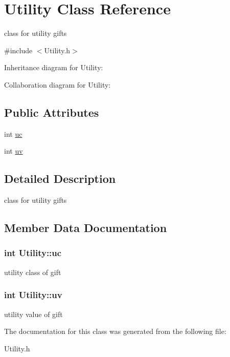 \hypertarget{classUtility}{}\section{Utility Class Reference}
\label{classUtility}


class for utility gifts  




{\ttfamily \#include $<$Utility.\+h$>$}



Inheritance diagram for Utility\+:


Collaboration diagram for Utility\+:
\subsection*{Public Attributes}
\begin{DoxyCompactItemize}
\item 
int \hyperlink{classUtility_ab04b1a933ee0cb62b34cc8cc21f6cf41}{uc}
\item 
int \hyperlink{classUtility_a70384995a315952127b7bba1c32b2a9f}{uv}
\end{DoxyCompactItemize}


\subsection{Detailed Description}
class for utility gifts 

\subsection{Member Data Documentation}
\subsubsection[{\texorpdfstring{uc}{uc}}]{\setlength{\rightskip}{0pt plus 5cm}int Utility\+::uc}\hypertarget{classUtility_ab04b1a933ee0cb62b34cc8cc21f6cf41}{}\label{classUtility_ab04b1a933ee0cb62b34cc8cc21f6cf41}
utility class of gift 
\subsubsection[{\texorpdfstring{uv}{uv}}]{\setlength{\rightskip}{0pt plus 5cm}int Utility\+::uv}\hypertarget{classUtility_a70384995a315952127b7bba1c32b2a9f}{}\label{classUtility_a70384995a315952127b7bba1c32b2a9f}
utility value of gift 

The documentation for this class was generated from the following file\+:\begin{DoxyCompactItemize}
\item 
Utility.\+h\end{DoxyCompactItemize}
